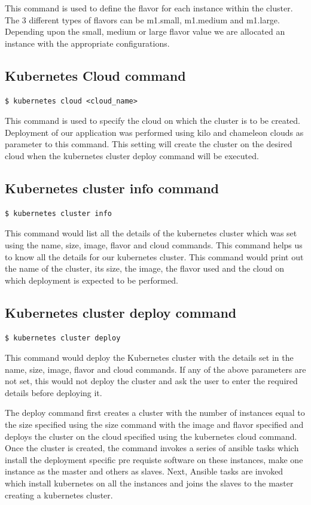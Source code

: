 \documentclass[9pt,twocolumn,twoside]{../../styles/osajnl}
\begin{document}
{\noindent
This command is used to define the flavor for each instance within the
cluster. The 3 different types of flavors can be m1.small, m1.medium
and m1.large. Depending upon the small, medium or large flavor value
we are allocated an instance with the appropriate configurations.

\subsection{Kubernetes Cloud command}
\begin{verbatim}
$ kubernetes cloud <cloud_name>
\end{verbatim}

\noindent
This command is used to specify the cloud on which the cluster is to
be created. Deployment of our application was performed using kilo
and chameleon clouds as parameter to this command. This setting will
create the cluster on the desired cloud when the kubernetes cluster
deploy command will be executed.

\subsection{Kubernetes cluster info command}
\begin{verbatim}
$ kubernetes cluster info
\end{verbatim}

\noindent
This command would list all the details of the kubernetes cluster
which was set using the name, size, image, flavor and cloud
commands. This command helps us to know all the details for our
kubernetes cluster. This command would print out the name of the
cluster, its size, the image, the flavor used and the cloud on which
deployment is expected to be performed.

\subsection{Kubernetes cluster deploy command}
\begin{verbatim}
$ kubernetes cluster deploy
\end{verbatim}

\noindent
This command would deploy the Kubernetes cluster with the details set
in the name, size, image, flavor and cloud commands. If any of the
above parameters are not set, this would not deploy the cluster and
ask the user to enter the required details before deploying it.

\noindent
The deploy command first creates a cluster with the number of
instances equal to the size specified using the size command with the
image and flavor specified and deploys the cluster on the cloud
specified using the kubernetes cloud command. Once the cluster is
created, the command invokes a series of ansible tasks which install
the deployment specific pre requiste software on these instances, make
one instance as the master and others as slaves. Next, Ansible tasks
are invoked which install kubernetes on all the instances and joins
the slaves to the master creating a kubernetes cluster.

}
\end{document}
